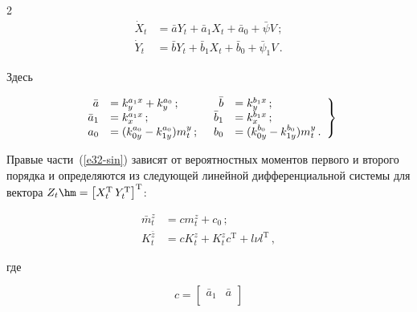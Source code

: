 \begin{multicols}{2}
\begin{align}
\dot X_t &= \bar a Y_t + \bar a_1 X_t + \bar a_0 +\bar\psi V\,;\label{e30-sin}\\

\dot Y_t &= \bar b Y_t + \bar b_1 X_t + \bar b_0 +\bar\psi_1 V\,.\label{e31-sin}

\end{align}

Здесь

    \begin{equation}

    \left.

    \begin{array}{rlrl}

    \bar a &= k_y^{a_1x} + k_y^{a_0}\,; &\enskip     \bar b &= k_y^{b_1x} \,;\\

    \bar a_1 &= k_x^{a_1 x}\,;&\enskip \bar b_1 &= k_x^{b_1 x}\,;\\

    a_0 &= (k_{0y}^{a_0} - k_{1y}^{a_0}) m_t^y\,;

 &\enskip b_0 &= (k_{0y}^{b_0} - k_{1y}^{b_0}) m_t^y\,.

    \end{array}

    \right\}

    \label{e32-sin}

    \end{equation}

Правые части~(\ref{e32-sin}) зависят от вероятностных моментов первого и второго порядка и определяются из следующей линейной дифференциальной системы для вектора  $Z_t \hm=\left[ X_t^{\mathrm{T}}\, Y_t^{\mathrm{T}}\right]^{\mathrm{T}}$:

  \begin{align*}

  \bar m_t^z &= cm_t^z + c_0\,; %

  \\

    K_t^{\bar z} &= c K_t^z +K_t^z c^{\mathrm{T}} + l\nu l^{\mathrm{T}}\,, %

    \end{align*}

где

    \begin{equation*}

    c=\begin{bmatrix}

    \bar a_1&\bar a\\


\end{bmatrix}
\end{equation*}
\end{multicols}
